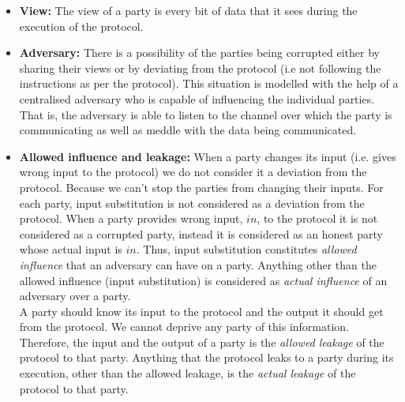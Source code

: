 \documentclass{llncs}
\begin{document}
\begin{itemize}
\item \textbf{View: } The view of a party is every bit of data that it sees during the execution of the protocol.

\item \textbf{Adversary:} There is a possibility of the parties being corrupted either by sharing their views or by deviating from the protocol (i.e not following the instructions as per the protocol). This situation is modelled with the help of a centralised adversary who is capable of influencing the individual parties. That is, the adversary is able to listen to the channel over which the party is communicating as well as meddle with the data being communicated.

\item \textbf{Allowed influence and leakage:} When a party changes its input (i.e. gives wrong input to the protocol) we do not consider it a deviation from the protocol. Because we can't stop the parties from changing their inputs. For each party, input substitution is not considered as a deviation from the protocol. When a party provides wrong input, $in$, to the protocol it is not considered as a corrupted party, instead it is considered as an honest party whose actual input is $in$.  Thus, input substitution constitutes \textit{allowed influence} that an adversary can have on a party. Anything other than the allowed influence (input substitution) is considered as \textit{actual influence} of an adversary over a party.\\
A party should know its input to the protocol and the output it should get from the protocol. We cannot deprive any party of this information. Therefore, the input and the output of a party is the \textit{allowed leakage} of the protocol to that party. Anything that the protocol leaks to a party during its execution, other than the allowed leakage, is the \textit{actual leakage} of the protocol to that party.


\end{itemize}
\end{document}
